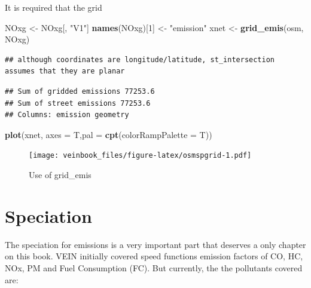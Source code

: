 \documentclass[12pt,graybox,envcountchap,sectrefs]{krantz}
\makeatletter
\newenvironment{Shaded}{\begin{snugshade}}{\end{snugshade}}
\newcommand{\KeywordTok}[1]{\textcolor[rgb]{0.13,0.29,0.53}{\textbf{#1}}}
\newcommand{\DataTypeTok}[1]{\textcolor[rgb]{0.13,0.29,0.53}{#1}}
\newcommand{\DecValTok}[1]{\textcolor[rgb]{0.00,0.00,0.81}{#1}}
\newcommand{\StringTok}[1]{\textcolor[rgb]{0.31,0.60,0.02}{#1}}
\newcommand{\NormalTok}[1]{#1}
\newenvironment{kframe}{%
\medskip{}
\setlength{\fboxsep}{.8em}
 \def\at@end@of@kframe{}%
 \ifinner\ifhmode%
  \def\at@end@of@kframe{\end{minipage}}%
  \begin{minipage}{\columnwidth}%
 \fi\fi%
 \def\FrameCommand##1{\hskip\@totalleftmargin \hskip-\fboxsep
 \colorbox{shadecolor}{##1}\hskip-\fboxsep
     \hskip-\linewidth \hskip-\@totalleftmargin \hskip\columnwidth}%
 \MakeFramed {\advance\hsize-\width
   \@totalleftmargin\z@ \linewidth\hsize
   \@setminipage}}%
 {\par\unskip\endMakeFramed%
 \at@end@of@kframe}
\renewenvironment{Shaded}{\begin{kframe}}{\end{kframe}}
\theoremstyle{definition}
\theoremstyle{definition}
\theoremstyle{definition}
\theoremstyle{remark}
\makeatother
\begin{document}
It is required that the grid

\begin{Shaded}
\begin{Highlighting}[]
\NormalTok{NOxg <-}\StringTok{ }\NormalTok{NOxg[, }\StringTok{"V1"}\NormalTok{]}
\KeywordTok{names}\NormalTok{(NOxg)[}\DecValTok{1}\NormalTok{] <-}\StringTok{ "emission"}
\NormalTok{xnet <-}\StringTok{ }\KeywordTok{grid_emis}\NormalTok{(osm, NOxg)}
\end{Highlighting}
\end{Shaded}

\begin{verbatim}
## although coordinates are longitude/latitude, st_intersection assumes that they are planar
\end{verbatim}

\begin{verbatim}
## Sum of gridded emissions 77253.6
## Sum of street emissions 77253.6
## Columns: emission geometry
\end{verbatim}

\begin{Shaded}
\begin{Highlighting}[]
\KeywordTok{plot}\NormalTok{(xnet, }\DataTypeTok{axes =}\NormalTok{ T,}\DataTypeTok{pal =} \KeywordTok{cpt}\NormalTok{(}\DataTypeTok{colorRampPalette =}\NormalTok{ T))}
\end{Highlighting}
\end{Shaded}

\begin{figure}
\centering
\texttt{[image: veinbook\_files/figure-latex/osmspgrid-1.pdf]}
\caption{\label{fig:osmspgrid}Use of grid\_emis}
\end{figure}

\chapter{Speciation}\label{he}

The speciation for emissions is a very important part that deserves a
only chapter on this book. VEIN initially covered speed functions
emission factors of CO, HC, NOx, PM and Fuel Consumption (FC). But
currently, the the pollutants covered are:
\end{document}
